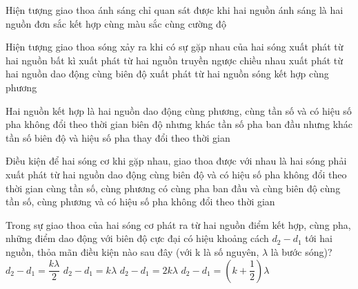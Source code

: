 \setcounter{paragraph}{0}
\PhanI
{}
\begin{ex}
Hiện tượng giao thoa ánh sáng chỉ quan sát được khi hai nguồn ánh sáng là hai nguồn
\choice
{đơn sắc}
{\True kết hợp}
{cùng màu sắc}
{cùng cường độ}
\loigiai{}
\end{ex}
\begin{ex}%
Hiện tượng giao thoa sóng xảy ra khi có sự gặp nhau của hai sóng
\choice
{xuất phát từ hai nguồn bất kì}
{xuất phát từ hai nguồn truyền ngược chiều nhau}
{xuất phát từ hai nguồn dao động cùng biên độ}
{\True xuất phát từ hai nguồn sóng kết hợp cùng phương}
\end{ex} 
\begin{ex}%
 Hai nguồn kết hợp là hai nguồn dao động cùng phương, cùng
\choice
{\True tần số và có hiệu số pha không đổi theo thời gian}
{biên độ nhưng khác tần số}
{pha ban đầu nhưng khác tần số}
{biên độ và hiệu số pha thay đổi theo thời gian}
\end{ex} 
\begin{ex}%
Điều kiện để hai sóng cơ khi gặp nhau, giao thoa được với nhau là hai sóng phải xuất phát từ hai nguồn dao động
\choice
{cùng biên độ và có hiệu số pha không đổi theo thời gian}
{cùng tần số, cùng phương}
{có cùng pha ban đầu và cùng biên độ}
{\True cùng tần số, cùng phương và có hiệu số pha không đổi theo thời gian}
\end{ex} 
\begin{ex}%
Trong sự giao thoa của hai sóng cơ phát ra từ hai nguồn điểm kết hợp, cùng pha, những điểm dao động với biên độ cực đại có hiệu khoảng cách $d_2 - d_1$ tới hai nguồn, thỏa mãn điều kiện nào sau đây (với k là số nguyên, $\lambda$ là bước sóng)?
\choice
{$d_2 - d_1=\dfrac{k\lambda}{2}$}
{\True $d_2 - d_1=k\lambda$ }
{$d_2 - d_1=2k\lambda$ }
{$d_2 - d_1=(k + \dfrac{1}{2}) \lambda$ }
\end{ex} 
